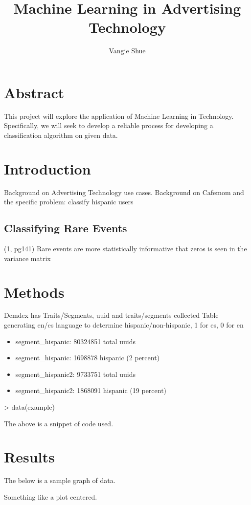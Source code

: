 \documentclass[a4paper]{article}
\title{Machine Learning in Advertising Technology}
\author{Vangie Shue}
\begin{document}


\maketitle
\section*{Abstract}
This project will explore the application of Machine Learning in Technology. Specifically, we will seek to develop a reliable process for developing a classification algorithm on given data.

\section*{Introduction}
Background on Advertising Technology use cases.
Background on Cafemom and the specific problem: classify hispanic users

\subsection*{Classifying Rare Events}
(1, pg141) Rare events are more statistically informative that zeros is seen in the variance matrix

\section*{Methods}
Demdex has Traits/Segments, uuid and traits/segments collected
Table generating en/es language to determine hispanic/non-hispanic, 1 for es, 0 for en
\begin{itemize}
  \item segment\_hispanic: 80324851 total uuids
  \item segment\_hispanic: 1698878 hispanic (2 percent)
  \item segment\_hispanic2: 9733751 total uuids
  \item segment\_hispanic2: 1868091 hispanic (19 percent)
\end{itemize}

\begin{Schunk}
\begin{Sinput}
> data(example)
\end{Sinput}
\end{Schunk}
The above is a snippet of code used. 

\section*{Results}
The below is a sample graph of data.
\begin{center}
Something like a plot centered.
\end{center}
\end{document}
